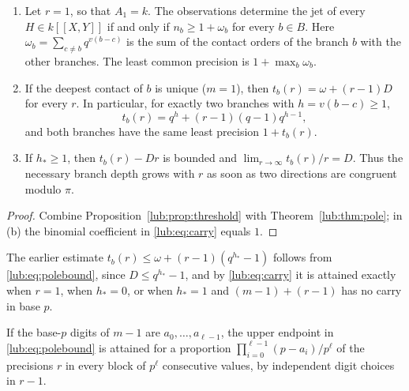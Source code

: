 \begin{corollary}\label{lub:cor:unique}
\begin{enumerate}[label=\textup{(\alph*)}]
\item Let $r=1$, so that $A_1=k$. The observations determine the jet of every
$H\in k[[X,Y]]$ if and only if $n_b\ge1+\omega_b$ for every $b\in B$. Here
$\omega_b=\sum_{c\ne b}q^{v(b-c)}$ is the sum of the contact orders of the branch $b$
with the other branches. The least common precision is $1+\max_b\omega_b$.
\item If the deepest contact of $b$ is unique \textup{(}$m=1$\textup{)}, then
$t_b(r)=\omega+(r-1)D$ for every $r$. In particular, for exactly two branches with
$h=v(b-c)\ge1$,
\[
 t_b(r)=q^h+(r-1)(q-1)q^{h-1},
\]
and both branches have the same least precision $1+t_b(r)$.
\item If $h_*\ge1$, then $t_b(r)-Dr$ is bounded and $\lim_{r\to\infty}t_b(r)/r=D$. Thus the
necessary branch depth grows with $r$ as soon as two directions are congruent modulo $\pi$.
\end{enumerate}
\end{corollary}
\begin{proof}
Combine Proposition~\ref{lub:prop:threshold} with Theorem~\ref{lub:thm:pole}; in (b) the binomial coefficient
in \eqref{lub:eq:carry} equals $1$.
\end{proof}

\begin{remark}\label{lub:rem:older}
The earlier estimate $t_b(r)\le\omega+(r-1)(q^{h_*}-1)$ follows from \eqref{lub:eq:polebound},
since $D\le q^{h_*}-1$, and by \eqref{lub:eq:carry} it is attained exactly when $r=1$, when
$h_*=0$, or when $h_*=1$ and $(m-1)+(r-1)$ has no carry in base $p$.
\end{remark}

\begin{remark}\label{lub:rem:frequency}
If the base-$p$ digits of $m-1$ are $a_0,\dots,a_{\ell-1}$, the upper endpoint in
\eqref{lub:eq:polebound} is attained for a proportion $\prod_{i=0}^{\ell-1}(p-a_i)/p^{\ell}$
of the precisions $r$ in every block of $p^{\ell}$ consecutive values, by independent digit
choices in $r-1$.
\end{remark}

